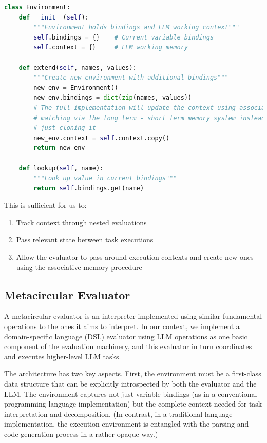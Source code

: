 \documentclass{article}
\begin{document}
\begin{lstlisting}[language=Python]
class Environment:
    def __init__(self):
        """Environment holds bindings and LLM working context"""
        self.bindings = {}    # Current variable bindings
        self.context = {}     # LLM working memory
    
    def extend(self, names, values):
        """Create new environment with additional bindings"""
        new_env = Environment()
        new_env.bindings = dict(zip(names, values))
        # The full implementation will update the context using associative
        # matching via the long term - short term memory system instead of 
        # just cloning it
        new_env.context = self.context.copy()  
        return new_env
    
    def lookup(self, name):
        """Look up value in current bindings"""
        return self.bindings.get(name)
\end{lstlisting}

This is sufficient for us to:
\begin{enumerate}
    \item Track context through nested evaluations
    \item Pass relevant state between task executions
    \item Allow the evaluator to pass around execution contexts and create new ones using the associative memory procedure
\end{enumerate}

\subsection{Metacircular Evaluator}

A metacircular evaluator is an interpreter implemented using similar fundamental operations to the ones it aims to interpret. In our context, we implement a domain-specific language (DSL) evaluator using LLM operations as one basic component of the evaluation machinery, and this evaluator in turn coordinates and executes higher-level LLM tasks.

The architecture has two key aspects. First, the environment must be a first-class data structure that can be explicitly introspected by both the evaluator and the LLM. The environment captures not just variable bindings (as in a conventional programming language implementation) but the complete context needed for task interpretation and decomposition. (In contrast, in a traditional language implementation, the execution environment is entangled with the parsing and code generation process in a rather opaque way.)
\end{document}
